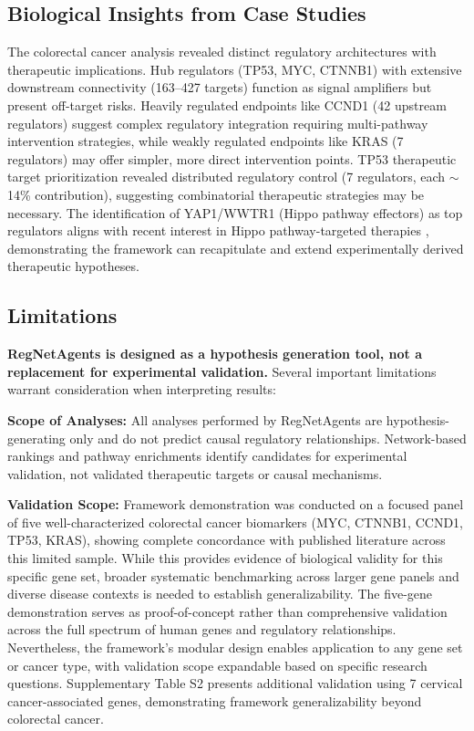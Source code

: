 \documentclass[11pt]{article}
\begin{document}
\subsection{Biological Insights from Case Studies}

The colorectal cancer analysis revealed distinct regulatory architectures with therapeutic implications. Hub regulators (TP53, MYC, CTNNB1) with extensive downstream connectivity (163--427 targets) function as signal amplifiers but present off-target risks. Heavily regulated endpoints like CCND1 (42 upstream regulators) suggest complex regulatory integration requiring multi-pathway intervention strategies, while weakly regulated endpoints like KRAS (7 regulators) may offer simpler, more direct intervention points. TP53 therapeutic target prioritization revealed distributed regulatory control (7 regulators, each $\sim$14\% contribution), suggesting combinatorial therapeutic strategies may be necessary. The identification of YAP1/WWTR1 (Hippo pathway effectors) as top regulators aligns with recent interest in Hippo pathway-targeted therapies \cite{hippo2019,hippo2011}, demonstrating the framework can recapitulate and extend experimentally derived therapeutic hypotheses.

\subsection{Limitations}

\textbf{RegNetAgents is designed as a hypothesis generation tool, not a replacement for experimental validation.} Several important limitations warrant consideration when interpreting results:

\textbf{Scope of Analyses:} All analyses performed by RegNetAgents are hypothesis-generating only and do not predict causal regulatory relationships. Network-based rankings and pathway enrichments identify candidates for experimental validation, not validated therapeutic targets or causal mechanisms.

\textbf{Validation Scope:} Framework demonstration was conducted on a focused panel of five well-characterized colorectal cancer biomarkers (MYC, CTNNB1, CCND1, TP53, KRAS), showing complete concordance with published literature across this limited sample. While this provides evidence of biological validity for this specific gene set, broader systematic benchmarking across larger gene panels and diverse disease contexts is needed to establish generalizability. The five-gene demonstration serves as proof-of-concept rather than comprehensive validation across the full spectrum of human genes and regulatory relationships. Nevertheless, the framework's modular design enables application to any gene set or cancer type, with validation scope expandable based on specific research questions. Supplementary Table S2 presents additional validation using 7 cervical cancer-associated genes, demonstrating framework generalizability beyond colorectal cancer.
\end{document}
